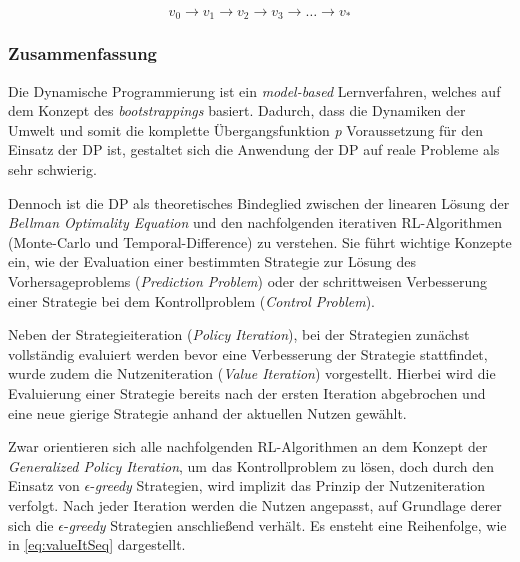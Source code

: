 \begin{equation}\label{eq:valueItSeq}
    v_0 \rightarrow v_1 \rightarrow v_2 \rightarrow v_3 \rightarrow \dots \rightarrow v_*
\end{equation}

\subsubsection{Zusammenfassung}
Die Dynamische Programmierung ist ein \textit{model-based} Lernverfahren, welches auf dem Konzept des \textit{bootstrappings} basiert. Dadurch, dass die Dynamiken der Umwelt und somit die komplette Übergangsfunktion \textit{p} Voraussetzung für den Einsatz der DP ist, gestaltet sich die Anwendung der DP auf reale Probleme als sehr schwierig.
\par 
Dennoch ist die DP als theoretisches Bindeglied zwischen der linearen Lösung der \textit{Bellman Optimality Equation} und den nachfolgenden iterativen RL-Algorithmen (Monte-Carlo und Temporal-Difference) zu verstehen. Sie führt wichtige Konzepte ein, wie der Evaluation einer bestimmten Strategie zur Lösung des Vorhersageproblems (\textit{Prediction Problem}) oder der schrittweisen Verbesserung einer Strategie bei dem Kontrollproblem (\textit{Control Problem}).
\par
Neben der Strategieiteration (\textit{Policy Iteration}), bei der Strategien zunächst vollständig evaluiert werden bevor eine Verbesserung der Strategie stattfindet, wurde zudem die Nutzeniteration (\textit{Value Iteration}) vorgestellt. Hierbei wird die Evaluierung einer Strategie bereits nach der ersten Iteration abgebrochen und eine neue gierige Strategie anhand der aktuellen Nutzen gewählt.
\par
Zwar orientieren sich alle nachfolgenden RL-Algorithmen an dem Konzept der \textit{Generalized Policy Iteration}, um das Kontrollproblem zu lösen, doch durch den Einsatz von $\epsilon$-\textit{greedy} Strategien, wird implizit das Prinzip der Nutzeniteration verfolgt. Nach jeder Iteration werden die Nutzen angepasst, auf Grundlage derer sich die $\epsilon$-\textit{greedy} Strategien anschließend verhält. Es ensteht eine Reihenfolge, wie in \ref{eq:valueItSeq} dargestellt.